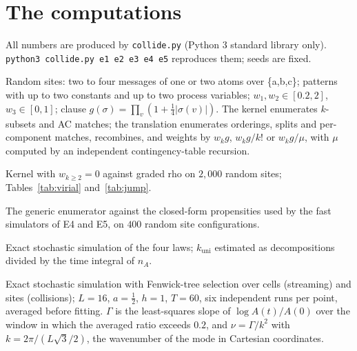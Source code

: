 \documentclass[11pt,a4paper]{article}
\theoremstyle{plain}
\theoremstyle{definition}
\theoremstyle{remark}
\newcommand{\rhoc}{\textsf{rho}}
\begin{document}
\section{The computations}\label{app:comp}

All numbers are produced by \texttt{collide.py} (Python 3 standard library
only). \texttt{python3 collide.py e1 e2 e3 e4 e5} reproduces them; seeds are
fixed.

\begin{description}[style=nextline]
\item[E1 (kernel = translation).] Random sites: two to four messages of one or
two atoms over \{a,b,c\}; patterns with up to two constants and up to two
process variables; $w_1,w_2\in[0.2,2]$, $w_3\in[0,1]$; clause
$g(\sigma)=\prod_v(1+\tfrac14|\sigma(v)|)$. The kernel enumerates $k$-subsets
and AC matches; the translation enumerates orderings, splits and per-component
matches, recombines, and weights by $w_kg$, $w_kg/k!$ or $w_kg/\mu$, with $\mu$
computed by an independent contingency-table recursion.
\item[E2 (ideal gas).] Kernel with $w_{k\geq2}=0$ against graded \rhoc{} on
$2{,}000$ random sites; Tables~\ref{tab:virial} and~\ref{tab:jump}.
\item[E3 (propensity tables).] The generic enumerator against the closed-form
propensities used by the fast simulators of E4 and E5, on $400$ random site
configurations.
\item[E4 (Lindemann).] Exact stochastic simulation of the four laws;
$k_{\mathrm{uni}}$ estimated as decompositions divided by the time integral of
$n_A$.
\item[E5 (lattice gas).] Exact stochastic simulation with Fenwick-tree
selection over cells (streaming) and sites (collisions); $L=16$, $a=\tfrac12$,
$h=1$, $T=60$, six independent runs per point, averaged before fitting.
$\Gamma$ is the least-squares slope of $\log A(t)/A(0)$ over the window in
which the averaged ratio exceeds $0.2$, and $\nu=\Gamma/k^2$ with
$k = 2\pi/(L\sqrt3/2)$, the wavenumber of the mode in Cartesian coordinates.
\end{description}
\end{document}
